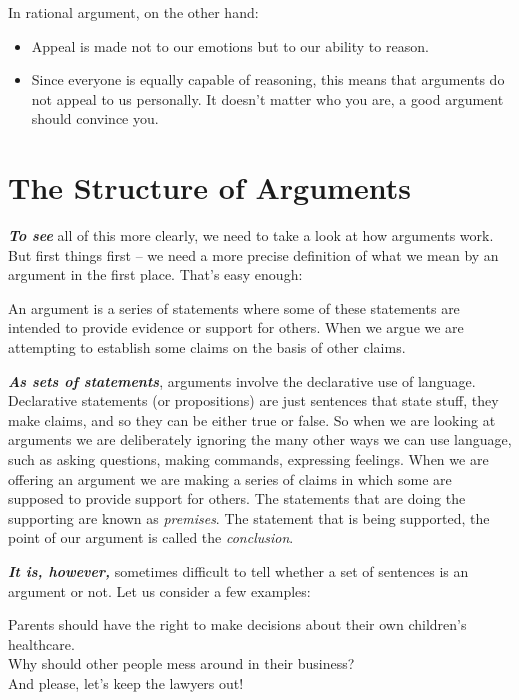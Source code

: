 \documentclass[
  12pt, openany]{book}
\makeatletter
\newenvironment{kframe}{%
\medskip{}
\setlength{\fboxsep}{.8em}
 \def\at@end@of@kframe{}%
 \ifinner\ifhmode%
  \def\at@end@of@kframe{\end{minipage}}%
  \begin{minipage}{\columnwidth}%
 \fi\fi%
 \def\FrameCommand##1{\hskip\@totalleftmargin \hskip-\fboxsep
 \colorbox{shadecolor}{##1}\hskip-\fboxsep
     \hskip-\linewidth \hskip-\@totalleftmargin \hskip\columnwidth}%
 \MakeFramed {\advance\hsize-\width
   \@totalleftmargin\z@ \linewidth\hsize
   \@setminipage}}%
 {\par\unskip\endMakeFramed%
 \at@end@of@kframe}
\newenvironment{rmdblock}[1]
  {
  \begin{itemize}
  \renewcommand{\labelitemi}{
    \raisebox{-.7\height}[0pt][0pt]{
      {\setkeys{Gin}{width=3em,keepaspectratio}\texttt{[image: img/\#1]}}
    }
  }
  \setlength{\fboxsep}{1em}
  \begin{kframe}
  \item
  }
  {
  \end{kframe}
  \end{itemize}
  }
\newenvironment{note}
  {\begin{rmdblock}{note}}
  {\end{rmdblock}}
\makeatother
\begin{document}
In rational argument, on the other hand:

\begin{itemize}
\item
  Appeal is made not to our emotions but to our ability to reason.
\item
  Since everyone is equally capable of reasoning, this means that arguments do not appeal to us personally. It doesn't matter who you are, a good argument should convince you.
\end{itemize}

\hypertarget{the-structure-of-arguments}{%
\section{The Structure of Arguments}\label{the-structure-of-arguments}}

\textbf{\emph{To see}} all of this more clearly, we need to take a look at how arguments work. But first things first -- we need a more precise definition of what we mean by an argument in the first place. That's easy enough:

\begin{note}

An argument is a series of statements where some of these statements are intended to provide evidence or support for others. When we argue we are attempting to establish some claims on the basis of other claims.

\end{note}

\textbf{\emph{As sets of statements}}, arguments involve the declarative use of language. Declarative statements (or propositions) are just sentences that state stuff, they make claims, and so they can be either true or false. So when we are looking at arguments we are deliberately ignoring the many other ways we can use language, such as asking questions, making commands, expressing feelings. When we are offering an argument we are making a series of claims in which some are supposed to provide support for others. The statements that are doing the supporting are known as \emph{premises}. The statement that is being supported, the point of our argument is called the \emph{conclusion}.

\textbf{\emph{It is, however,}} sometimes difficult to tell whether a set of sentences is an argument or not. Let us consider a few examples:

\begin{center}

\begin{argument}

Parents should have the right to make decisions about their own children's healthcare.\\
Why should other people mess around in their business?\\
And please, let's keep the lawyers out!

\end{argument}

\end{center}
\end{document}
